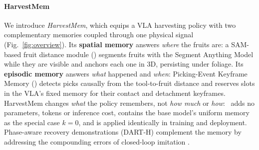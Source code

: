 \paragraph{HarvestMem} We introduce \emph{HarvestMem}, which equips a VLA harvesting policy with two complementary memories coupled through one physical signal (Fig.~\ref{fig:overview}). Its \textbf{spatial memory} answers \emph{where} the fruits are: a SAM-based fruit distance module (\fdm) segments fruits with the Segment Anything Model \citep{kirillov2023sam} while they are visible and anchors each one in 3D, persisting under foliage. Its \textbf{episodic memory} answers \emph{what} happened and \emph{when}: Picking-Event Keyframe Memory (\pekm) detects picks causally from the tool-to-fruit distance and reserves slots in the VLA's fixed memory for their contact and detachment keyframes. HarvestMem changes \emph{what} the policy remembers, not \emph{how much} or \emph{how}: \pekm\ adds no parameters, tokens or inference cost, contains the base model's uniform memory as the special case $k=0$, and is applied identically in training and deployment. Phase-aware recovery demonstrations (DART-H) complement the memory by addressing the compounding errors of closed-loop imitation \citep{ross2011dagger}.

